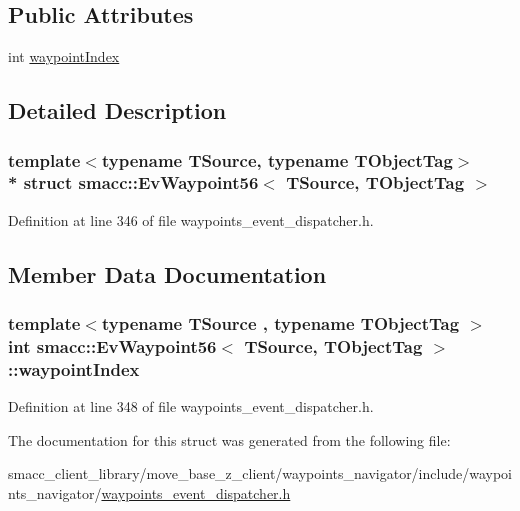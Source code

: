 \subsection*{Public Attributes}
\begin{DoxyCompactItemize}
\item 
int \hyperlink{structsmacc_1_1EvWaypoint56_a918bfff0dac67dd9e14ee21f7e81bc37}{waypoint\+Index}
\end{DoxyCompactItemize}


\subsection{Detailed Description}
\subsubsection*{template$<$typename T\+Source, typename T\+Object\+Tag$>$\\*
struct smacc\+::\+Ev\+Waypoint56$<$ T\+Source, T\+Object\+Tag $>$}



Definition at line 346 of file waypoints\+\_\+event\+\_\+dispatcher.\+h.



\subsection{Member Data Documentation}
\subsubsection[{\texorpdfstring{waypoint\+Index}{waypointIndex}}]{\setlength{\rightskip}{0pt plus 5cm}template$<$typename T\+Source , typename T\+Object\+Tag $>$ int {\bf smacc\+::\+Ev\+Waypoint56}$<$ T\+Source, T\+Object\+Tag $>$\+::waypoint\+Index}\hypertarget{structsmacc_1_1EvWaypoint56_a918bfff0dac67dd9e14ee21f7e81bc37}{}\label{structsmacc_1_1EvWaypoint56_a918bfff0dac67dd9e14ee21f7e81bc37}


Definition at line 348 of file waypoints\+\_\+event\+\_\+dispatcher.\+h.



The documentation for this struct was generated from the following file\+:\begin{DoxyCompactItemize}
\item 
smacc\+\_\+client\+\_\+library/move\+\_\+base\+\_\+z\+\_\+client/waypoints\+\_\+navigator/include/waypoints\+\_\+navigator/\hyperlink{waypoints__event__dispatcher_8h}{waypoints\+\_\+event\+\_\+dispatcher.\+h}\end{DoxyCompactItemize}
